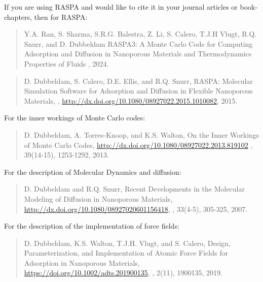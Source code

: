 If you are using RASPA and would like to cite it in your journal articles or book-chapters, then for RASPA:

\begin{quote}
Y.A. Ran, S. Sharma, S.R.G. Balestra, Z. Li, S. Calero, T.J.H Vlugt, R.Q. Snurr, and D. Dubbeldam
\newblock RASPA3: A Monte Carlo Code for Computing Adsorption and Diffusion in Nanoporous Materials and Thermodynamics Properties of Fluids
, 2024.
\end{quote}
\begin{quote}
D. Dubbeldam, S. Calero, D.E. Ellis, and R.Q. Snurr,
\newblock RASPA: Molecular Simulation Software for Adsorption and Diffusion in Flexible Nanoporous Materials,
, \url{http://dx.doi.org/10.1080/08927022.2015.1010082}, 2015.
\end{quote}
For the inner workings of Monte Carlo codes:
\begin{quote}
D. Dubbeldam, A. Torres-Knoop, and K.S. Walton,
\newblock On the Inner Workings of Monte Carlo Codes,
\newblock  \url{http://dx.doi.org/10.1080/08927022.2013.819102}
, 39(14-15), 1253-1292, 2013.
\end{quote}
For the description of Molecular Dynamics and diffusion:
\begin{quote}
D. Dubbeldam and R.Q. Snurr,
\newblock Recent Developments in the Molecular Modeling of Diffusion in Nanoporous Materials,
\newblock  \url{http://dx.doi.org/10.1080/08927020601156418},
, 33(4-5), 305-325, 2007.
\end{quote}
For the description of the implementation of force fields:
\begin{quote}
D. Dubbeldam, K.S. Walton, T.J.H. Vlugt, and S. Calero,
\newblock Design, Parameterization, and Implementation of Atomic Force Fields for Adsorption in Nanoporous Materials,
\newblock  \url{https://doi.org/10.1002/adts.201900135},
, 2(11), 1900135, 2019.
\end{quote}

